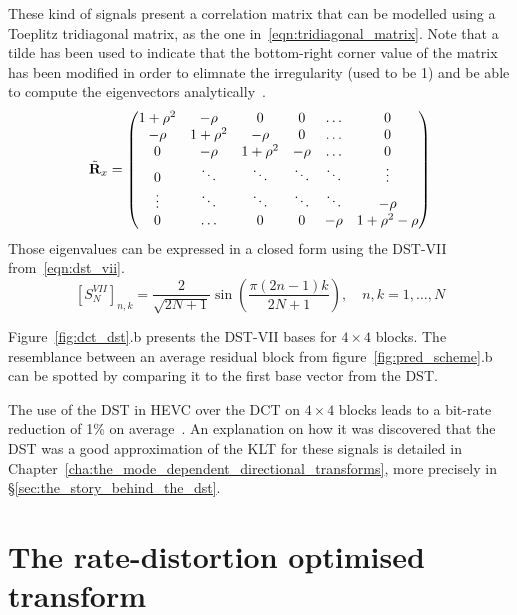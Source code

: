 \documentclass[11pt,a4paper,openright,twoside]{book}
\numberwithin{equation}{section} %
\numberwithin{figure}{section} %
\numberwithin{table}{section} %
\begin{document}
These kind of signals present a correlation matrix that can be modelled
using a Toeplitz tridiagonal matrix, as the one
in~\eqref{eqn:tridiagonal_matrix}.
Note that a tilde has been used to indicate that the bottom-right corner
value of the matrix has been modified in order to elimnate the
irregularity (used to be 1) and be able to compute the eigenvectors
analytically~\cite{han-10-spatial-adaptive-transform,
yueh-05-eigenvalues-tridiagonal}.
\begin{equation}
	\tilde{\mathbf{R}}_x =
	\begin{pmatrix}
		1+\rho^2 & -\rho    & 0        & 0      & \hdots & 0            \\
		-\rho    & 1+\rho^2 & -\rho    & 0      & \hdots & 0            \\
		0        & -\rho    & 1+\rho^2 & -\rho  & \hdots & 0            \\
		0        & \ddots   & \ddots   & \ddots & \ddots & \vdots       \\
		\vdots   & \ddots   & \ddots   & \ddots & \ddots & -\rho        \\
		0        & \hdots   & 0        & 0      & -\rho  & 1+\rho^2-\rho
	\end{pmatrix}
	\label{eqn:tridiagonal_matrix}
\end{equation}
Those eigenvalues can be expressed in a closed form using the
\ac{DST}-VII from~\eqref{eqn:dst_vii}.
\begin{equation}
	{\left[S_{N}^{VII} \right]}_{n,k} =
	\frac{2}{\sqrt{2N+1}}\sin\left(\frac{\pi(2n-1)k}{2N+1}\right),
	\quad
	n,k = 1, \dots, N
	\label{eqn:dst_vii}
\end{equation}

Figure~\ref{fig:dct_dst}.b presents the \ac{DST}-VII bases for
$4\times4$ blocks.
The resemblance between an average residual block
from figure~\ref{fig:pred_scheme}.b can be spotted by comparing it to
the first base vector from the \ac{DST}.

The use of the \ac{DST} in \ac{HEVC} over the \ac{DCT} on $4\times4$
blocks leads to a bit-rate reduction of 1\% on
average~\cite{sullivan-12-overview-hevc}.
An explanation on how it was discovered that the \ac{DST} was a good
approximation of the \ac{KLT} for these signals is detailed in
Chapter~\ref{cha:the_mode_dependent_directional_transforms}, more
precisely in \S\ref{sec:the_story_behind_the_dst}.

\section{The rate-distortion optimised transform}
\label{sec:the_rate_distortion_optimised_transform}
\end{document}
